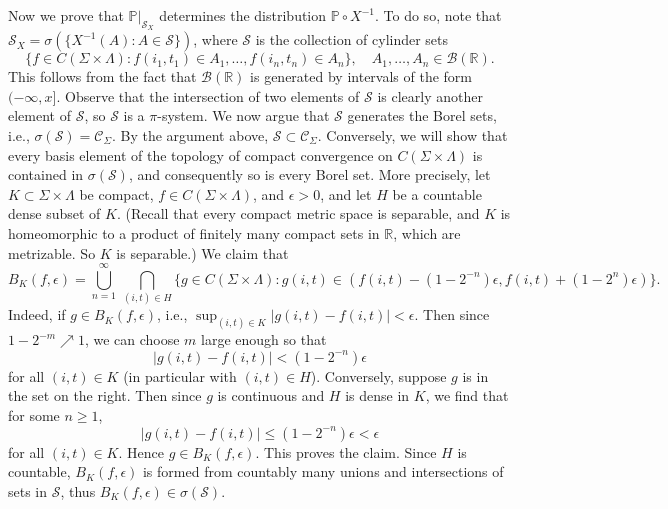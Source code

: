 \documentclass[12pt]{article}
\begin{document}
		Now we prove that $\mathbb{P}|_{\mathcal{S}_X}$ determines the distribution $\mathbb{P}\circ X^{-1}$. To do so, note that $\mathcal{S}_X = \sigma(\{X^{-1}(A) : A\in\mathcal{S}\})$, where $\mathcal{S}$ is the collection of cylinder sets
		\[
		\{f\in C(\Sigma\times\Lambda) : f(i_1,t_1)\in A_1, \dots, f(i_n,t_n) \in A_n\}, \quad A_1,\dots,A_n\in\mathcal{B}(\mathbb{R}). 
		\]
		This follows from the fact that $\mathcal{B}(\mathbb{R})$ is generated by intervals of the form $(-\infty,x]$. Observe that the intersection of two elements of $\mathcal{S}$ is clearly another element of $\mathcal{S}$, so $\mathcal{S}$ is a $\pi$-system. We now argue that $\mathcal{S}$ generates the Borel sets, i.e., $\sigma(\mathcal{S}) = \mathcal{C}_\Sigma$. By the argument above, $\mathcal{S}\subset \mathcal{C}_\Sigma$. Conversely, we will show that every basis element of the topology of compact convergence on $C(\Sigma\times\Lambda)$ is contained in $\sigma(\mathcal{S})$, and consequently so is every Borel set. More precisely, let $K\subset\Sigma\times\Lambda$ be compact, $f\in C(\Sigma\times\Lambda)$, and $\epsilon>0$, and let $H$ be a countable dense subset of $K$. (Recall that every compact metric space is separable, and $K$ is homeomorphic to a product of finitely many compact sets in $\mathbb{R}$, which are metrizable. So $K$ is separable.) We claim that
		\[
		B_K(f,\epsilon) = \bigcup_{n=1}^\infty\,\bigcap_{(i,t)\in H} \{g\in C(\Sigma\times\Lambda) : g(i,t) \in  (f(i,t)-(1-2^{-n})\epsilon, f(i,t) + (1-2^{n})\epsilon)\}.
		\]
		Indeed, if $g\in B_K(f,\epsilon)$, i.e., $\sup_{(i,t)\in K} |g(i,t)-f(i,t)| < \epsilon$. Then since $1-2^{-m}\nearrow 1$, we can choose $m$ large enough so that 
		\[
		|g(i,t)-f(i,t)| < (1-2^{-n})\epsilon
		\] 
		for all $(i,t)\in K$ (in particular with $(i,t)\in H$). Conversely, suppose $g$ is in the set on the right. Then since $g$ is continuous and $H$ is dense in $K$, we find that for some $n\geq 1$,
		\[
		|g(i,t)-f(i,t)| \leq (1-2^{-n})\epsilon < \epsilon
		\]
		for all $(i,t)\in K$. Hence $g\in B_K(f,\epsilon)$. This proves the claim. Since $H$ is countable, $B_K(f,\epsilon)$ is formed from countably many unions and intersections of sets in $\mathcal{S}$, thus $B_K(f,\epsilon)\in\sigma(\mathcal{S})$.
		
\end{document}
